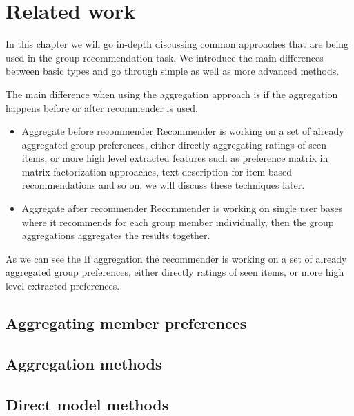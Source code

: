 \chapter{Related work} \label{chap:related_work}
In this chapter we will go in-depth discussing common approaches that are being used in the group recommendation task. We introduce the main differences between basic types  and go through simple as well as more advanced methods.\newline

The main difference when using the aggregation approach is if the aggregation happens before or after recommender is used.
\begin{itemize}
    \item Aggregate before recommender \newline
    Recommender is working on a set of already aggregated group preferences, either directly aggregating ratings of seen items, or more high level extracted features such as preference matrix in matrix factorization approaches, text description for item-based recommendations and so on, we will discuss these techniques later.
    \item Aggregate after recommender \newline
    Recommender is working on single user bases where it recommends for each group member individually, then the group aggregations aggregates the results together.
\end{itemize}

As we can see the
If aggregation the recommender is working on a set of already aggregated group preferences, either directly ratings of seen items, or more high level extracted preferences.

\section{Aggregating member preferences}

\section{Aggregation methods}

\section{Direct model methods}